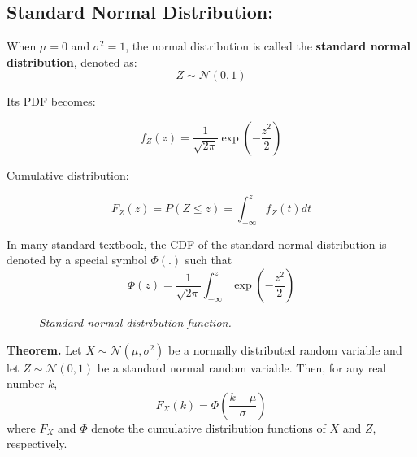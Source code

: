 \documentclass[twoside]{book}
\begin{document}
\subsection{Standard Normal Distribution:}

When $\mu = 0$ and $\sigma^2 = 1$, the normal distribution is called the \textbf{standard normal distribution}, denoted as:
\[
Z \sim \mathcal{N}(0, 1)
\]

Its PDF becomes:
\begin{textbox}
\[
f_Z(z) = \dfrac{1}{\sqrt{2\pi}} \exp\left( -\frac{z^2}{2} \right)
\]
\end{textbox}


Cumulative distribution:
\begin{textbox}
$$F_Z(z) = P(Z \leq z) = \int_{-\infty}^z f_Z(t)dt$$
\end{textbox}

In many standard textbook, the CDF of the standard normal distribution is denoted by a special symbol $\Phi(.)$ such that
$$\Phi(z) = \dfrac{1}{\sqrt{2\pi}} \int_{-\infty}^z \exp\left( -\frac{z^2}{2} \right)$$

\begin{figure}
\begin{center}
\end{center}
\caption{\textit{Standard normal distribution function.}}
\end{figure}


\begin{textbox}
\textbf{Theorem.} Let \( X \sim \mathcal{N}(\mu, \sigma^2) \) be a normally distributed random variable and let \( Z \sim \mathcal{N}(0, 1) \) be a standard normal random variable. Then, for any real number \( k \),
\[
F_X(k) = \Phi\left( \frac{k - \mu}{\sigma} \right)
\]
where \( F_X \) and \( \Phi \) denote the cumulative distribution functions of \( X \) and \( Z \), respectively.
\end{textbox}
\end{document}
